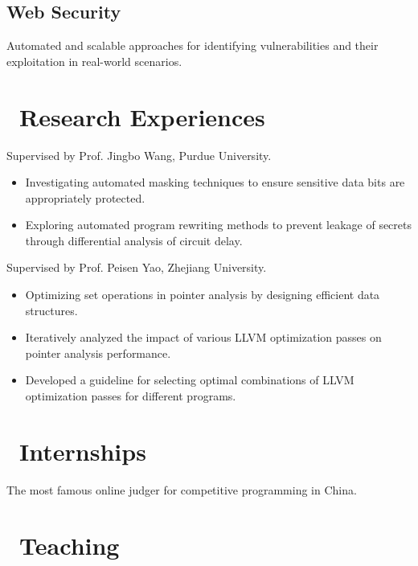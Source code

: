 \documentclass{resume}
\begin{document}
\subsection{\textbf{Web Security}}
Automated and scalable approaches for identifying vulnerabilities and their exploitation in real-world scenarios.

\section{\faSearch\ Research Experiences}
Supervised by Prof. Jingbo Wang, Purdue University.  
\begin{itemize}  
  \item Investigating automated masking techniques to ensure sensitive data bits are appropriately protected.  
  \item Exploring automated program rewriting methods to prevent leakage of secrets through differential analysis of circuit delay.
\end{itemize}

Supervised by Prof. Peisen Yao, Zhejiang University.  
\begin{itemize}  
  \item Optimizing set operations in pointer analysis by designing efficient data structures.  
  \item Iteratively analyzed the impact of various LLVM optimization passes on pointer analysis performance.  
  \item Developed a guideline for selecting optimal combinations of LLVM optimization passes for different programs.  
\end{itemize}

\section{\faUsers\ Internships}
The most famous online judger for competitive programming in China.

\section{\faBook\ Teaching}
\end{document}

